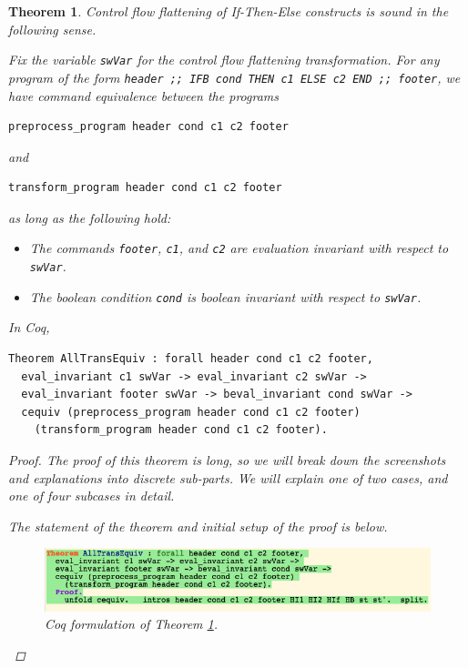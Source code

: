 \documentclass[12pt,notitlepage]{report}
\theoremstyle{plain}
\newtheorem{theo}{Theorem}[section]
\theoremstyle{definition}
\numberwithin{equation}{section}
\begin{document}
\begin{theo}\label{maintheo}
Control flow flattening of If-Then-Else constructs is sound in the following sense.  
\par Fix the variable \verb$swVar$ for the control flow flattening transformation.  For any program of the form \verb$header ;; IFB cond THEN c1 ELSE c2 END ;; footer$, we have command equivalence between the programs
\begin{verbatim}preprocess_program header cond c1 c2 footer\end{verbatim}
and
\begin{verbatim}transform_program header cond c1 c2 footer\end{verbatim}
as long as the following hold:
\begin{itemize}
    \item The commands \verb$footer$, \verb$c1$, and \verb$c2$ are evaluation invariant with respect to \verb$swVar$.
    \item The boolean condition \verb$cond$ is boolean invariant with respect to \verb$swVar$.
\end{itemize}
In Coq,
\begin{verbatim}
Theorem AllTransEquiv : forall header cond c1 c2 footer, 
  eval_invariant c1 swVar -> eval_invariant c2 swVar -> 
  eval_invariant footer swVar -> beval_invariant cond swVar ->
  cequiv (preprocess_program header cond c1 c2 footer) 
    (transform_program header cond c1 c2 footer).
\end{verbatim}
\begin{proof}
    The proof of this theorem is long, so we will break down the screenshots and explanations into discrete sub-parts.  We will explain one of two cases, and one of four subcases in detail.
    
    \par The statement of the theorem and initial setup of the proof is below.
    
    \noindent\begin{figure}[H]
        \centering
        \includegraphics[scale=0.6]{alltrans_main}
        \caption{Coq formulation of Theorem \ref{maintheo}.}
        \label{fig:maintheo}
        \end{figure}
    

\end{proof}
\end{theo}
\end{document}
